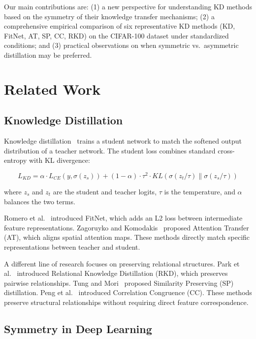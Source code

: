 \documentclass[symmetry,article,submit,moreauthors]{Definitions/mdpi}
\begin{document}
Our main contributions are: (1) a new perspective for understanding KD methods based on the symmetry of their knowledge transfer mechanisms; (2) a comprehensive empirical comparison of six representative KD methods (KD, FitNet, AT, SP, CC, RKD) on the CIFAR-100 dataset under standardized conditions; and (3) practical observations on when symmetric vs.\ asymmetric distillation may be preferred.

\section{Related Work}

\subsection{Knowledge Distillation}

Knowledge distillation~\cite{ref7} trains a student network to match the softened output distribution of a teacher network. The student loss combines standard cross-entropy with KL divergence:

\begin{equation}
L_{KD} = \alpha \cdot L_{CE}(y, \sigma(z_s)) + (1-\alpha) \cdot \tau^2 \cdot KL(\sigma(z_t/\tau) \parallel \sigma(z_s/\tau))
\end{equation}

where $z_s$ and $z_t$ are the student and teacher logits, $\tau$ is the temperature, and $\alpha$ balances the two terms.

Romero et al.~\cite{ref8} introduced FitNet, which adds an L2 loss between intermediate feature representations. Zagoruyko and Komodakis~\cite{ref9} proposed Attention Transfer (AT), which aligns spatial attention maps. These methods directly match specific representations between teacher and student.

A different line of research focuses on preserving relational structures. Park et al.~\cite{ref12} introduced Relational Knowledge Distillation (RKD), which preserves pairwise relationships. Tung and Mori~\cite{ref10} proposed Similarity Preserving (SP) distillation. Peng et al.~\cite{ref11} introduced Correlation Congruence (CC). These methods preserve structural relationships without requiring direct feature correspondence.

\subsection{Symmetry in Deep Learning}
\end{document}
